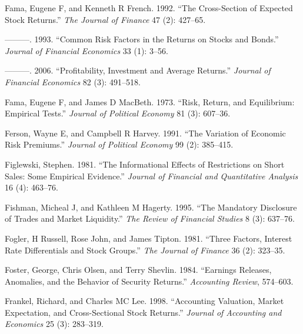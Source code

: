 \documentclass[
  letterpaper,
  DIV=11,
  numbers=noendperiod]{scrreprt}
\newlength{\cslhangindent}
\newlength{\cslentryspacingunit} %
\newenvironment{CSLReferences}[2] %
 {%
  \setlength{\parindent}{0pt}
  \ifodd #1
  \let\oldpar\par
  \def\par{\hangindent=\cslhangindent\oldpar}
  \fi
  \setlength{\parskip}{#2\cslentryspacingunit}
 }%
 {}
\begin{document}
\begin{CSLReferences}{1}{0}
\leavevmode{}%
Fama, Eugene F, and Kenneth R French. 1992. {``The Cross-Section of
Expected Stock Returns.''} \emph{The Journal of Finance} 47 (2):
427--65.

\leavevmode{}%
---------. 1993. {``Common Risk Factors in the Returns on Stocks and
Bonds.''} \emph{Journal of Financial Economics} 33 (1): 3--56.

\leavevmode{}%
---------. 2006. {``Profitability, Investment and Average Returns.''}
\emph{Journal of Financial Economics} 82 (3): 491--518.

\leavevmode{}%
Fama, Eugene F, and James D MacBeth. 1973. {``Risk, Return, and
Equilibrium: Empirical Tests.''} \emph{Journal of Political Economy} 81
(3): 607--36.

\leavevmode{}%
Ferson, Wayne E, and Campbell R Harvey. 1991. {``The Variation of
Economic Risk Premiums.''} \emph{Journal of Political Economy} 99 (2):
385--415.

\leavevmode{}%
Figlewski, Stephen. 1981. {``The Informational Effects of Restrictions
on Short Sales: Some Empirical Evidence.''} \emph{Journal of Financial
and Quantitative Analysis} 16 (4): 463--76.

\leavevmode{}%
Fishman, Micheal J, and Kathleen M Hagerty. 1995. {``The Mandatory
Disclosure of Trades and Market Liquidity.''} \emph{The Review of
Financial Studies} 8 (3): 637--76.

\leavevmode{}%
Fogler, H Russell, Rose John, and James Tipton. 1981. {``Three Factors,
Interest Rate Differentials and Stock Groups.''} \emph{The Journal of
Finance} 36 (2): 323--35.

\leavevmode{}%
Foster, George, Chris Olsen, and Terry Shevlin. 1984. {``Earnings
Releases, Anomalies, and the Behavior of Security Returns.''}
\emph{Accounting Review}, 574--603.

\leavevmode{}%
Frankel, Richard, and Charles MC Lee. 1998. {``Accounting Valuation,
Market Expectation, and Cross-Sectional Stock Returns.''} \emph{Journal
of Accounting and Economics} 25 (3): 283--319.


\end{CSLReferences}
\end{document}
